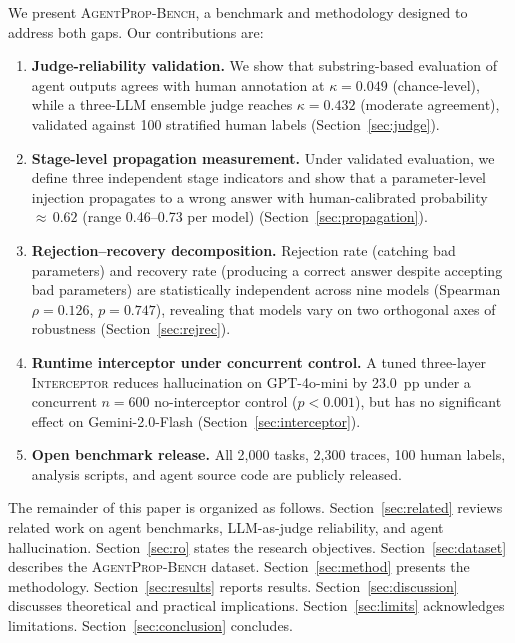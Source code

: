 \documentclass[preprint,review,12pt,3p]{elsarticle}
\newcommand{\bench}{\textsc{AgentProp-Bench}\xspace}
\newcommand{\interceptor}{\textsc{Interceptor}\xspace}
\begin{document}
We present \bench{}, a benchmark and methodology designed to address
both gaps.
Our contributions are:
\begin{enumerate}
  \item \textbf{Judge-reliability validation.}
    We show that substring-based evaluation of agent outputs agrees with
    human annotation at $\kappa{=}0.049$ (chance-level), while a
    three-LLM ensemble judge reaches $\kappa{=}0.432$ (moderate
    agreement), validated against 100 stratified human labels
    (Section~\ref{sec:judge}).
  \item \textbf{Stage-level propagation measurement.}
    Under validated evaluation, we define three independent stage
    indicators and show that a parameter-level injection propagates to a
    wrong answer with human-calibrated probability ${\approx}\,0.62$
    (range 0.46--0.73 per model) (Section~\ref{sec:propagation}).
  \item \textbf{Rejection--recovery decomposition.}
    Rejection rate (catching bad parameters) and recovery rate (producing
    a correct answer despite accepting bad parameters) are statistically
    independent across nine models (Spearman $\rho{=}0.126$,
    $p{=}0.747$), revealing that models vary on two orthogonal axes of
    robustness (Section~\ref{sec:rejrec}).
  \item \textbf{Runtime interceptor under concurrent control.}
    A tuned three-layer \interceptor{} reduces hallucination on
    GPT-4o-mini by 23.0~pp under a concurrent $n{=}600$ no-interceptor
    control ($p < 0.001$), but has no significant effect on
    Gemini-2.0-Flash (Section~\ref{sec:interceptor}).
  \item \textbf{Open benchmark release.}
    All 2{,}000 tasks, 2{,}300 traces, 100 human labels, analysis
    scripts, and agent source code are publicly released.
\end{enumerate}

The remainder of this paper is organized as follows.
Section~\ref{sec:related} reviews related work on agent benchmarks,
LLM-as-judge reliability, and agent hallucination.
Section~\ref{sec:ro} states the research objectives.
Section~\ref{sec:dataset} describes the \bench{} dataset.
Section~\ref{sec:method} presents the methodology.
Section~\ref{sec:results} reports results.
Section~\ref{sec:discussion} discusses theoretical and practical
implications.
Section~\ref{sec:limits} acknowledges limitations.
Section~\ref{sec:conclusion} concludes.
\end{document}
